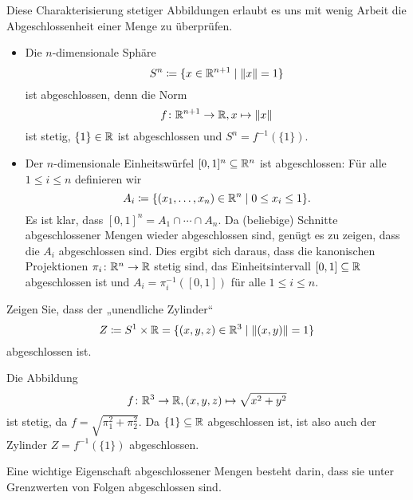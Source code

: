 \documentclass[a4paper,10pt]{article}
\begin{document}
Diese Charakterisierung stetiger Abbildungen erlaubt es uns mit wenig Arbeit die Abgeschlossenheit einer Menge zu überprüfen.


\begin{bsp}
 \begin{itemize}
  \item
   Die $n$-dimensionale Sphäre
   \[
    S^n \coloneqq \{x \in \mathbb{R}^{n+1} \mid \|x\| = 1\}
   \]
   ist abgeschlossen, denn die Norm
   \[
    f \colon \mathbb{R}^{n+1} \to \mathbb{R}, x \mapsto \|x\|
   \]
   ist stetig, $\{1\} \in \mathbb{R}$ ist abgeschlossen und $S^n = f^{-1}(\{1\})$.
  \item
   Der $n$-dimensionale Einheitswürfel $[0,1]^n \subseteq \mathbb{R}^n$ ist abgeschlossen: Für alle $1 \leq i \leq n$ definieren wir
   \[
    A_i \coloneqq \{(x_1, \dotsc, x_n) \in \mathbb{R}^n \mid 0 \leq x_i \leq 1\}.
   \]
   Es ist klar, dass $[0,1]^n = A_1 \cap \dotsb \cap A_n$. Da (beliebige) Schnitte abgeschlossener Mengen wieder abgeschlossen sind, genügt es zu zeigen, dass die $A_i$ abgeschlossen sind. Dies ergibt sich daraus, dass die kanonischen Projektionen $\pi_i \colon \mathbb{R}^n \to \mathbb{R}$ stetig sind, das Einheitsintervall $[0,1] \subseteq \mathbb{R}$ abgeschlossen ist und $A_i = \pi_i^{-1}([0,1])$ für alle $1 \leq i \leq n$.
 \end{itemize}
\end{bsp}


\begin{question}
 Zeigen Sie, dass der „unendliche Zylinder“
 \[
  Z \coloneqq S^1 \times \mathbb{R} = \{(x,y,z) \in \mathbb{R}^3 \mid \|(x,y)\| = 1\}
 \]
 abgeschlossen ist.
\end{question}
\begin{solution}
 Die Abbildung
 \[
  f \colon \mathbb{R}^3 \to \mathbb{R}, (x,y,z) \mapsto \sqrt{x^2 + y^2}
 \]
 ist stetig, da $f = \sqrt{\pi_1^2 + \pi_2^2}$. Da $\{1\} \subseteq \mathbb{R}$ abgeschlossen ist, ist also auch der Zylinder $Z = f^{-1}(\{1\})$ abgeschlossen.
\end{solution}


Eine wichtige Eigenschaft abgeschlossener Mengen besteht darin, dass sie unter Grenzwerten von Folgen abgeschlossen sind.
\end{document}
